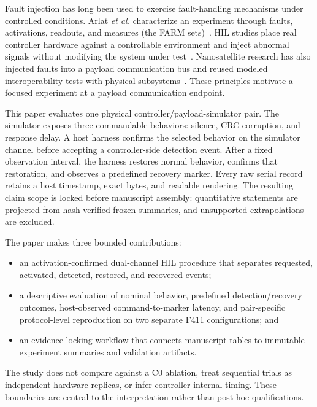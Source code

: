 \documentclass[conference]{IEEEtran}
\begin{document}
Fault injection has long been used to exercise fault-handling mechanisms under controlled conditions. Arlat \emph{et al.} characterize an experiment through faults, activations, readouts, and measures (the FARM sets)~\cite{arlat1990}. HIL studies place real controller hardware against a controllable environment and inject abnormal signals without modifying the system under test~\cite{abboush2022,abboush2024}. Nanosatellite research has also injected faults into a payload communication bus and reused modeled interoperability tests with physical subsystems~\cite{batista2019,conceicao2025}. These principles motivate a focused experiment at a payload communication endpoint.

This paper evaluates one physical controller/payload-simulator pair. The simulator exposes three commandable behaviors: silence, CRC corruption, and response delay. A host harness confirms the selected behavior on the simulator channel before accepting a controller-side detection event. After a fixed observation interval, the harness restores normal behavior, confirms that restoration, and observes a predefined recovery marker. Every raw serial record retains a host timestamp, exact bytes, and readable rendering. The resulting claim scope is locked before manuscript assembly: quantitative statements are projected from hash-verified frozen summaries, and unsupported extrapolations are excluded.

The paper makes three bounded contributions:

\begin{itemize}
  \item an activation-confirmed dual-channel HIL procedure that separates requested, activated, detected, restored, and recovered events;
  \item a descriptive evaluation of nominal behavior, predefined detection/recovery outcomes, host-observed command-to-marker latency, and pair-specific protocol-level reproduction on two separate F411 configurations; and
  \item an evidence-locking workflow that connects manuscript tables to immutable experiment summaries and validation artifacts.
\end{itemize}

The study does not compare against a C0 ablation, treat sequential trials as independent hardware replicas, or infer controller-internal timing. These boundaries are central to the interpretation rather than post-hoc qualifications.
\end{document}
